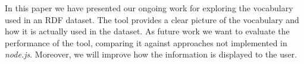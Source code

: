 In this paper we have presented our ongoing work for exploring the vocabulary used in an RDF dataset. The tool provides a clear picture of the vocabulary and how it is actually used in the dataset. As future work we want to evaluate the performance of the tool, comparing it against approaches not implemented in \emph{node.js}. Moreover, we will improve how the information is displayed to the user.
